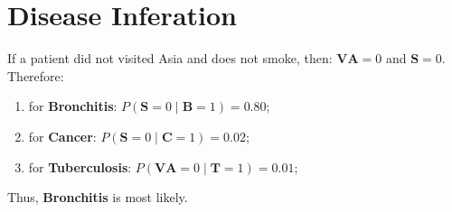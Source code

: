 \documentclass[../CSC_5RO11_TA_TP6.tex]{subfiles}
\begin{document}
\section{Disease Inferation}
\noindent If a patient did not visited Asia and does not smoke, then: $\mathbf{VA} = 0$ and $\mathbf{S} = 0$. Therefore:
\begin{enumerate}[noitemsep]
    \item for \textbf{Bronchitis}: $P(\mathbf{S} = 0\;|\;\mathbf{B} = 1) = 0.80$;
    \item for \textbf{Cancer}: $P(\mathbf{S} = 0\;|\;\mathbf{C} = 1) = 0.02$;
    \item for \textbf{Tuberculosis}: $P(\mathbf{VA} = 0\;|\;\mathbf{T} = 1) = 0.01$;
\end{enumerate}
Thus, \textbf{Bronchitis} is most likely.
\end{document}
